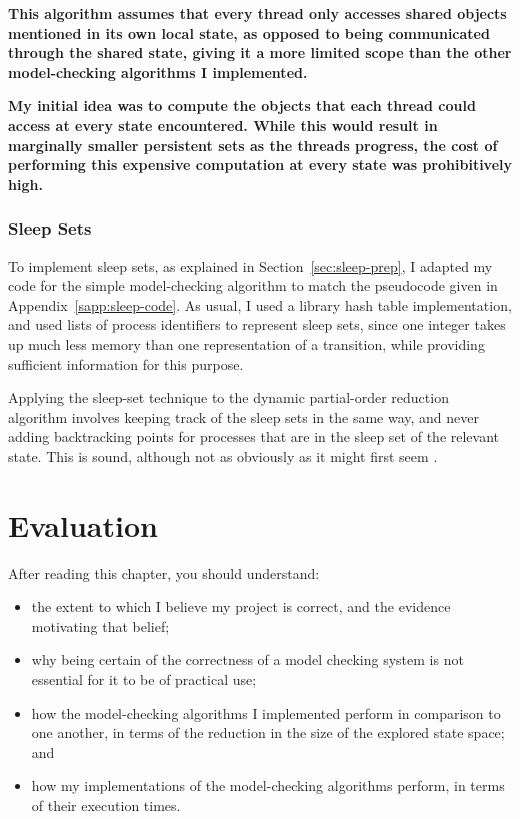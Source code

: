 \documentclass[12pt,a4paper,twoside,openright]{report}
\newenvironment{understandinglist}
	{\begin{itemize} \itemsep 0em}{\end{itemize}}
\begin{document}
\textbf{This algorithm assumes that every thread only
accesses shared objects mentioned in its own
local state, as opposed to being communicated
through the shared state, giving it a more
limited scope than the other model-checking
algorithms I implemented.}

\textbf{My initial idea was to compute the objects that
each thread could access at every state encountered.
While this would result in marginally smaller
persistent sets as the threads progress, the cost
of performing this expensive computation at
every state was prohibitively high.}


\subsection{Sleep Sets}

To implement sleep sets, as
explained in Section~\ref{sec:sleep-prep},
I adapted my
code for the simple model-checking
algorithm to match the pseudocode
given in Appendix~\ref{sapp:sleep-code}.
As usual, I used a
library hash table implementation,
and used lists of process identifiers
to represent sleep sets, since one
integer takes up much less memory
than one representation of a transition,
while providing sufficient information
for this purpose.

Applying the sleep-set technique to the
dynamic partial-order reduction
algorithm involves keeping track of the
sleep sets in the same way, and never
adding backtracking points for
processes that are in the sleep set
of the relevant state. This is
sound, although not as obviously as
it might first seem \cite{flan05addm}.

\chapter{Evaluation}
\label{cha:evaluation}

After reading this chapter,
you should understand:
\begin{understandinglist}
	\item the extent to which I believe
	my project is correct, and the evidence
	motivating that belief;
	\item why being certain of the
	correctness of a model checking
	system is not essential for it
	to be of practical use;
	\item how the model-checking
	algorithms I implemented perform
	in comparison to one another,
	in terms of the reduction in the
	size of the explored state space; and
	\item how my implementations
	of the model-checking algorithms
	perform, in terms of their
	execution times.
\end{understandinglist}
\end{document}

